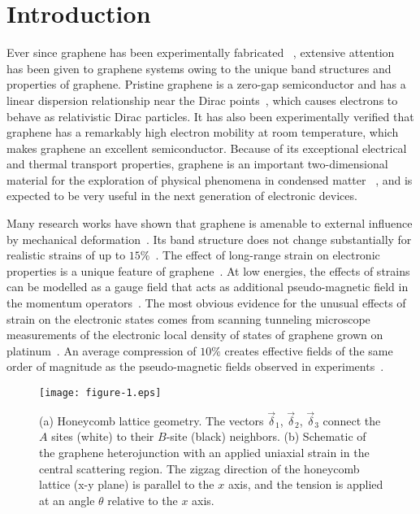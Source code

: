 \documentclass[reprint,amsmath,amssymb,aps,superscriptaddress]{revtex4-2}
\begin{document}
\maketitle

\section{Introduction}
Ever since graphene has been experimentally fabricated ~\cite{Novoselov,Geim2007}, extensive attention~\cite{Bolotin2008, Neto2009} has been given to graphene systems owing to the unique band structures and properties of graphene. Pristine graphene is a zero-gap semiconductor and has a linear dispersion relationship near the Dirac points~\cite{Neto2009,Wallace1947}, which causes electrons to behave as relativistic Dirac particles. It has also been experimentally verified that graphene has a remarkably high electron mobility at room temperature, which makes graphene an excellent semiconductor. Because of its exceptional electrical and thermal transport properties, graphene is an important two-dimensional material for the exploration of  physical phenomena in condensed matter ~\cite{Neto2009}, and is expected to be very useful in the next generation of electronic devices.

Many research works have shown that graphene is amenable to external influence by mechanical deformation~\cite{Seon-Myeong,Pereira2009}. Its band structure does not change substantially for realistic strains of up to $15\%$~\cite{Pereira2009,Lee2008}. The effect of long-range strain on electronic properties is a unique feature of graphene~\cite{Suzuura2002, Manes2007}. At low energies, the effects of strains can be modelled as a gauge field that acts as additional pseudo-magnetic field in the momentum operators~\cite{Vozmediano2010}. The most obvious evidence for the unusual effects of strain on the electronic states comes from scanning tunneling microscope measurements of the electronic local density of states of graphene grown on platinum~\cite{Levy2010}. An average compression of $10\%$ creates effective fields of the same order of magnitude as the pseudo-magnetic fields observed in experiments~\cite{Abedpour2011}.
\begin{figure}[b]
	\centering
	\texttt{[image: figure-1.eps]}
	
	\caption{(a) Honeycomb lattice geometry. The vectors $\vec{\delta}_{1}$, $\vec{\delta}_{2}$, $\vec{\delta}_{3}$ connect the $A$ sites (white) to their $B$-site (black) neighbors. (b) Schematic of the graphene heterojunction with an applied uniaxial strain in the central scattering region. The zigzag direction of the honeycomb lattice (x-y plane) is parallel to the $x$ axis, and the tension is applied at an angle $\theta$ relative to the $x$ axis.}
	\label{fig:structure}
\end{figure}
\end{document}
